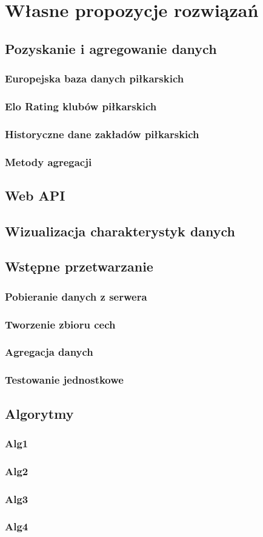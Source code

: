 \chapter{Własne propozycje rozwiązań}
    \section{Pozyskanie i agregowanie danych}
        \subsection{Europejska baza danych piłkarskich}
        \subsection{Elo Rating klubów piłkarskich}
        \subsection{Historyczne dane zakładów piłkarskich}
        \subsection{Metody agregacji}
    \section{Web API}
    \section{Wizualizacja charakterystyk danych}
    \section{Wstępne przetwarzanie}
        \subsection{Pobieranie danych z serwera}
        \subsection{Tworzenie zbioru cech}
        \subsection{Agregacja danych}
        \subsection{Testowanie jednostkowe}
    \section{Algorytmy}
        \subsection{Alg1}
        \subsection{Alg2}
        \subsection{Alg3}
        \subsection{Alg4}